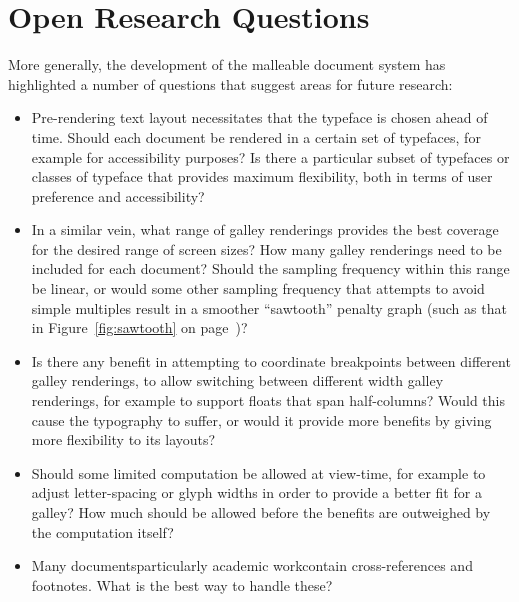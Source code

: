 \section{Open Research Questions}

More generally, the development of the malleable document system has highlighted a number of questions that suggest areas for future research:

\begin{itemize}
 \item Pre-rendering text layout necessitates that the typeface is chosen ahead of time. Should each document be rendered in a certain set of typefaces, for example for accessibility purposes? Is there a particular subset of typefaces or classes of typeface that provides maximum flexibility, both in terms of user preference and accessibility?

\item In a similar vein, what range of galley renderings provides the best coverage for the desired range of screen sizes? How many galley renderings need to be included for each document? Should the sampling frequency within this range be linear, or would some other sampling frequency that attempts to avoid simple multiples result in a smoother ``sawtooth'' penalty graph (such as that in Figure~\ref{fig:sawtooth} on page~\pageref{fig:sawtooth})?

\item Is there any benefit in attempting to coordinate breakpoints between different galley renderings, to allow switching between different width galley renderings, for example to support floats that span half-columns? Would this cause the typography to suffer, or would it provide more benefits by giving more flexibility to its layouts?

\item Should some limited computation be allowed at view-time, for example to adjust letter-spacing or glyph widths in order to provide a better fit for a galley? How much should be allowed before the benefits are outweighed by the computation itself?

\item Many documents\ed particularly academic work\ed contain cross-references and footnotes. What is the best way to handle these?%

\end{itemize}





